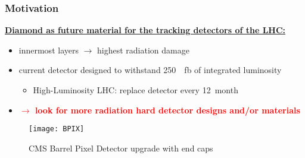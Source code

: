 \begin{frame}
	\frametitle{Motivation}
	\textbf{\underline{Diamond as future material for the tracking detectors of the LHC:}}
	\vspace*{5pt}
	\begin{itemize}
		\setlength{\itemsep}{\fill}
		\item innermost layers $\rightarrow$ highest radiation damage
		\item current detector designed to withstand \SI{250}{\per\femto\barn} of integrated luminosity
		\begin{itemize}
			\vspace*{2pt}
			\item High-Luminosity LHC: replace detector every \SI{12}{month}
		\end{itemize}
		\item \textbf{\textcolor{red}{$\rightarrow$ look for more radiation hard detector designs and/or materials}}
	\end{itemize}
	\begin{figure}
		\centering
		\texttt{[image: BPIX]}
		\caption{CMS Barrel Pixel Detector upgrade with end caps}
	\end{figure}
\end{frame}
